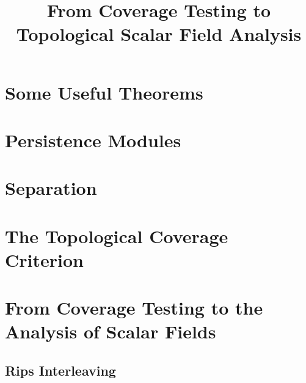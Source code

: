 \documentclass[12pt]{article}
\begin{document}
\title{From Coverage Testing to Topological Scalar Field Analysis}




\section{Some Useful Theorems}


\section{Persistence Modules}


\section{Separation}


\clearpage
\section{The Topological Coverage Criterion}


\clearpage
\section{From Coverage Testing to the Analysis of Scalar Fields}


\subsection{Rips Interleaving}


\appendix




\end{document}
